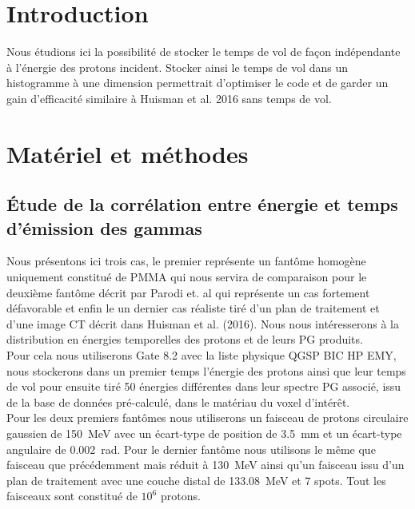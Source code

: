 \documentclass[11pt,a4paper,oldfontcommands]{memoir}
\begin{document}
\section{Introduction}

 Nous étudions ici la possibilité de stocker le temps de vol de façon indépendante à l'énergie des protons incident. Stocker ainsi le temps de vol dans un histogramme à une dimension permettrait d'optimiser le code et de garder un gain d'efficacité similaire à Huisman et al. 2016 sans temps de vol. 


\section{Matériel et méthodes}

\subsection{\'Etude de la corrélation entre énergie et temps d'émission des gammas}

Nous présentons ici trois cas, le premier représente un fantôme homogène uniquement constitué de PMMA qui nous servira de comparaison pour le deuxième fantôme décrit par Parodi et. al \cite{1487723} qui représente un cas fortement défavorable et enfin le un dernier cas réaliste tiré d'un plan de traitement et d'une image CT décrit dans Huisman et al. (2016). Nous nous intéresserons à la distribution en énergies temporelles des protons et de leurs PG produits.\\ Pour cela nous utiliserons Gate 8.2 avec la liste physique QGSP BIC HP EMY, nous stockerons dans un premier temps l'énergie des protons ainsi que leur temps de vol pour ensuite tiré 50 énergies différentes dans leur spectre PG associé, issu de la base de données pré-calculé, dans le matériau du voxel d'intérêt.\\
Pour les deux premiers fantômes nous utiliserons un faisceau de protons circulaire gaussien de 150~MeV avec un écart-type de position de 3.5~mm et un écart-type angulaire de 0.002~rad. Pour le dernier fantôme nous utilisons le même que faisceau que précédemment mais réduit à 130~MeV ainsi qu'un faisceau issu d'un plan de traitement avec une couche distal de 133.08~MeV et 7 spots. Tout les faisceaux sont constitué de $10^6$ protons. 
\end{document}
